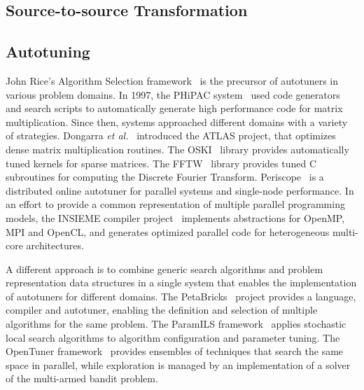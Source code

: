 \documentclass[conference]{IEEEtran}
\begin{document}
\subsection{Source-to-source Transformation}
\label{sec:org7d9f470}
\subsection{Autotuning}
\label{sec:orga0baa23}
John Rice's Algorithm Selection framework~\cite{rice1976algorithm} is the
precursor of autotuners in various problem domains. In 1997, the PHiPAC
system~\cite{bilmes1997optimizing} used code generators and search scripts
to automatically generate high performance code for matrix multiplication. Since
then, systems approached different domains with a variety of strategies.
Dongarra \emph{et al.}~\cite{dongarra1998automatically} introduced the ATLAS
project, that optimizes dense matrix multiplication routines. The
OSKI~\cite{vuduc2005oski} library provides automatically tuned kernels for
sparse matrices. The FFTW~\cite{frigo1998fftw} library provides tuned C
subroutines for computing the Discrete Fourier Transform.
Periscope~\cite{gerndt2010automatic} is a distributed online autotuner for
parallel systems and single-node performance. In an effort to provide a common
representation of multiple parallel programming models, the INSIEME compiler
project~\cite{jordan2012multi} implements abstractions for OpenMP, MPI and
OpenCL, and generates optimized parallel code for heterogeneous multi-core
architectures.

A different approach is to combine generic search algorithms and problem
representation data structures in a single system that enables the
implementation of autotuners for different domains. The
PetaBricks~\cite{ansel2009petabricks} project provides a language,
compiler and autotuner, enabling the definition and selection of multiple
algorithms for the same problem. The ParamILS
framework~\cite{hutter2009paramils} applies stochastic local search
algorithms to algorithm configuration and parameter tuning. The OpenTuner
framework~\cite{ansel2014opentuner} provides ensembles of techniques that
search the same space in parallel, while exploration is managed by an
implementation of a solver of the multi-armed bandit problem.
\end{document}
